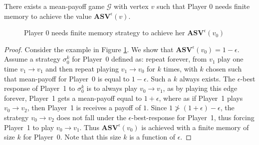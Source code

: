 \begin{theorem}
\label{ThmExNeedFinMem}
There exists a mean-payoff game $\mathcal{G}$ with vertex $v$ such that Player $0$ needs finite memory to achieve the value $\mathbf{ASV}^{\epsilon}(v)$.
\end{theorem}
\begin{figure}
    \centering
    \caption{Player $0$ needs finite memory strategy to achieve her $\mathbf{ASV}^{\epsilon}(v_0)$}
    \label{fig:finite_strategy_response}
\end{figure}
\begin{proof}
Consider the example in Figure \ref{fig:finite_strategy_response}. We show that $\mathbf{ASV}^{\epsilon}(v_0) = 1 - \epsilon$. Assume a strategy $\sigma_0^{k}$ for Player~0 defined as: repeat forever, from $v_1$ play one time $v_1 \to v_1$ and then repeat playing $v_1 \to v_0$ for $k$ times, with $k$ chosen such that mean-payoff for Player~0 is equal to $1 - \epsilon$. Such a $k$ always exists. The $\epsilon$-best response of Player~1 to $\sigma_0^{k}$ is to always play $v_0 \to v_1$, as by playing this edge forever, Player~1 gets a mean-payoff equal to $1+\epsilon$, where as if Player~1 plays $v_0 \to v_2$, then Player~1 is receives a payoff of $1$. Since $1 \ngtr (1 + \epsilon) - \epsilon$, the strategy $v_0 \to v_2$ does not fall under the $\epsilon$-best-response for Player~1, thus forcing Player~1 to play $v_0 \to v_1$. Thus $\mathbf{ASV}^{\epsilon}(v_0)$ is achieved with a finite memory of size $k$ for Player~0. Note that this size $k$ is a function of $\epsilon$.
\end{proof}